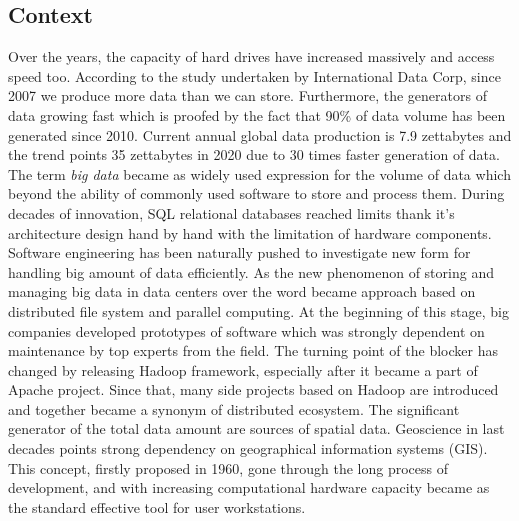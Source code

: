 \documentclass[a4paper,12pt,oneside]{report}
\begin{document}
	\subsection*{Context}
	Over the years, the capacity of hard drives have increased massively and
	access speed too. According to the study undertaken
	by International Data Corp, since 2007
	we produce more data than we can store. Furthermore, the generators of data 
	growing fast which is proofed by the fact that 90\% of data volume has been
	generated since 2010. Current  annual global data production is  7.9 zettabytes
	and the trend points 35 zettabytes in 2020 due to 30 times faster generation of
	data\cite{digit_universe}. 
	The term \textit{big data} became as widely used expression for the volume of
	data which beyond the ability of commonly used software to store and process 
	them.   During decades of innovation, SQL relational databases reached limits
	thank it's architecture design hand by hand with the limitation of
	hardware components.  Software engineering has been naturally pushed to 
	investigate new form for handling big amount of data efficiently.  As  the new
	phenomenon   of storing and managing big data in data centers over the word
	became approach based on distributed file system and parallel computing. At the
	beginning of this stage, big companies developed prototypes of software which
	was strongly dependent on maintenance by top experts from the field.  The
	turning point of the blocker has changed by releasing  Hadoop framework,
	especially after it became a part of Apache project. Since that, many side
	projects based on Hadoop are introduced and together became a synonym of 
	distributed ecosystem. 
	The significant generator of the total data amount are sources of
	spatial data. Geoscience in last decades points strong dependency on
	geographical information systems (GIS). This concept, firstly proposed in 1960,
	gone through  the long process of development, and with increasing computational
	hardware capacity became as the standard  effective tool for user workstations.
	
\end{document}
